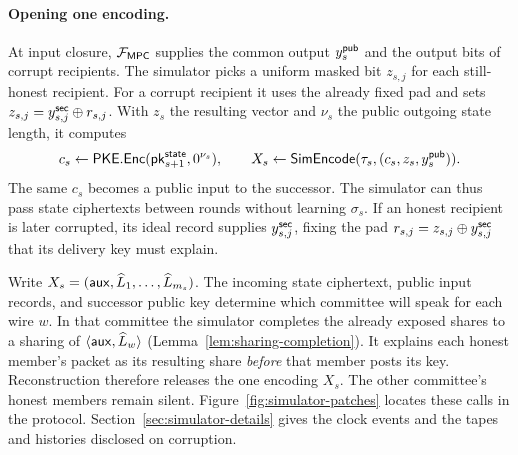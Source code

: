 \paragraph{Opening one encoding.}
At input closure, $\mathcal F_{\mathsf{MPC}}$ supplies the common output $y^{\mathsf{pub}}_s$ and
the output bits of corrupt recipients.  The simulator picks a uniform
masked bit $z_{s,j}$ for each still-honest recipient.  For a corrupt
recipient it uses the already fixed pad and sets
$z_{s,j}=y^{\mathsf{sec}}_{s,j}\oplus r_{s,j}$.  With $z_s$ the resulting vector
and $\nu_s$ the public outgoing state length, it computes
\[
   c_s\mathrel{\leftarrow}\mathsf{PKE}.\mathsf{Enc}(\mathsf{pk}^{\mathsf{state}}_{s+1},0^{\nu_s}),\qquad
   X_s\mathrel{\leftarrow}\mathsf{SimEncode}(\tau_s,(c_s,z_s,y^{\mathsf{pub}}_s)).
\]
The same $c_s$ becomes a public input to the successor.  The simulator
can thus pass state ciphertexts between rounds without learning
$\sigma_s$.  If an honest recipient is later corrupted, its ideal
record supplies $y^{\mathsf{sec}}_{s,j}$, fixing the pad $r_{s,j}=z_{s,j}\oplus
y^{\mathsf{sec}}_{s,j}$ that its delivery key must explain.

Write $X_s=(\mathsf{aux},\widehat L_1,\ldots,\widehat L_{m_s})$.
The incoming state ciphertext, public input records, and successor
public key determine which committee will speak for each wire $w$.
In that committee the simulator completes the already exposed shares
to a sharing of $\langle\mathsf{aux},\widehat L_w\rangle$
(Lemma~\ref{lem:sharing-completion}).  It explains each honest member's
packet as its resulting share \emph{before} that member posts its key.
Reconstruction therefore releases the one encoding $X_s$.  The other
committee's honest members remain silent.  Figure~\ref{fig:simulator-patches}
locates these calls in the protocol.  Section~\ref{sec:simulator-details}
gives the clock events and the tapes and histories disclosed on corruption.
